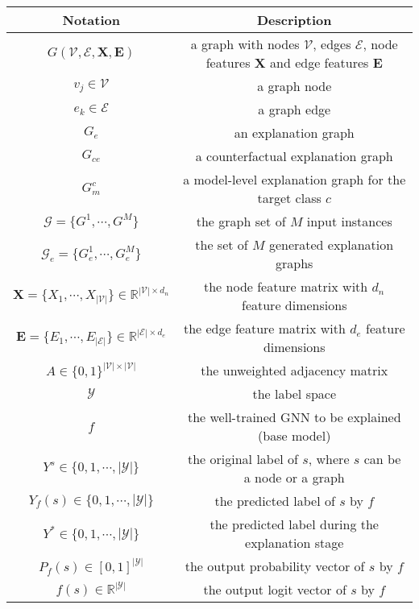 \begin{table}[th]
    \centering
    \begin{tabular}{c|c}
    \toprule
            \textbf{Notation} & \textbf{Description}\\
            \midrule
         $G(\mathcal{V},\mathcal{E}, \mathbf{X}, \mathbf{E})$& a graph with nodes $\mathcal{V}$, edges $\mathcal{E}$, node features $\mathbf{X}$ and edge features $\mathbf{E}$ \\
         $v_j\in \mathcal{V}$ & a graph node\\
         $e_k\in \mathcal{E}$ & a graph edge\\
         $G_e$ & an explanation graph\\
         $G_{ce}$ & a counterfactual explanation graph\\
         $G_{m}^c$& a model-level explanation graph for the target class $c$ \\
         $\mathcal{G}=\{G^1, \cdots, G^M\}$ & the graph set of $M$ input instances\\
         $\mathcal{G}_e=\{G_e^1, \cdots, G_e^M\}$ & the set of $M$ generated explanation graphs\\
         $ \mathbf{X}=\{X_1, \cdots, X_{|\mathcal{V}|}\}\in\mathbb{R}^{|\mathcal{V}|\times d_n}$ & the node feature matrix with $d_n$ feature dimensions\\
         $ \mathbf{E}=\{E_1,\cdots, E_{|\mathcal{E}|}\}\in \mathbb{R}^{|\mathcal{E}|\times d_e}$ & the edge feature matrix with $d_e$ feature dimensions \\
         $A\in\{0,1\}^{|\mathcal{V}|\times |\mathcal{V}|}$ &the unweighted adjacency matrix\\
         $ \mathcal{Y}$ & the label space\\
         $ f$ & the well-trained GNN to be explained (base model)\\
         $ Y^s\in\{0,1,\cdots, |\mathcal{Y}|\}$ & the original label of $s$, where $s$ can be a node or a graph\\
         $ Y_f(s)\in\{0,1,\cdots, |\mathcal{Y}|\}$ &the predicted label of $s$ by $f$\\
         $ Y^\ast\in\{0,1,\cdots, |\mathcal{Y}|\}$ & the predicted label during the explanation stage\\
         $ P_f(s)\in[0,1]^{|\mathcal{Y}|}$ &the output probability vector of $s$ by $f$\\
         $ f(s)\in\mathbb{R}^{|\mathcal{Y}|}$ & the output logit vector of $s$ by $f$\\

\end{tabular}
\end{table}

